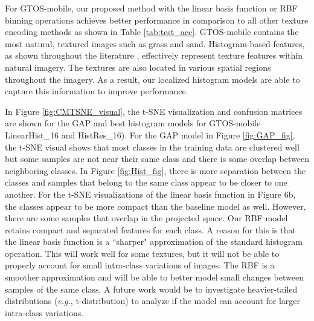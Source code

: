\documentclass[journal]{IEEEtai}
\begin{document}
	For GTOS-mobile, our proposed method with the linear basis function or RBF binning operations achieves better performance in comparison to all other texture encoding methods as shown in Table \ref{tab:test_acc}. GTOS-mobile contains the most natural, textured images such as grass and sand. Histogram-based features, as shown throughout the literature \cite{liu2019bow,tuceryan1993texture}, effectively represent texture features within natural imagery. The textures are also located in various spatial regions throughout the imagery. As a result, our localized histogram models are able to capture this information to improve performance.
	
	In Figure \ref{fig:CMTSNE_visual}, the t-SNE visualization \cite{maaten2008visualizing} and confusion matrices are shown for the GAP and best histogram models for GTOS-mobile LinearHist\_16 and HistRes\_16). For the GAP model in Figure \ref{fig:GAP_fig}, the t-SNE visual shows that most classes in the training data are clustered well but some samples are not near their same class and there is some overlap between neighboring classes. In Figure \ref{fig:Hist_fig}, there is more separation between the classes and samples that belong to the same class appear to be closer to one another. For the t-SNE visualizations of the linear basis function in Figure 6b, the classes appear to be more compact than the baseline model as well. However, there are some samples that overlap in the projected space. Our RBF model retains compact and separated features for each class. A reason for this is that the linear basis function is a ``sharper" approximation of the standard histogram operation. This will work well for some textures, but it will not be able to properly account for small intra-class variations of images. The RBF is a smoother approximation and will be able to better model small changes between samples of the same class. A future work would be to investigate heavier-tailed distributions (\textit{e.g.}, t-distribution) to analyze if the model can account for larger intra-class variations. 
	
\end{document}
